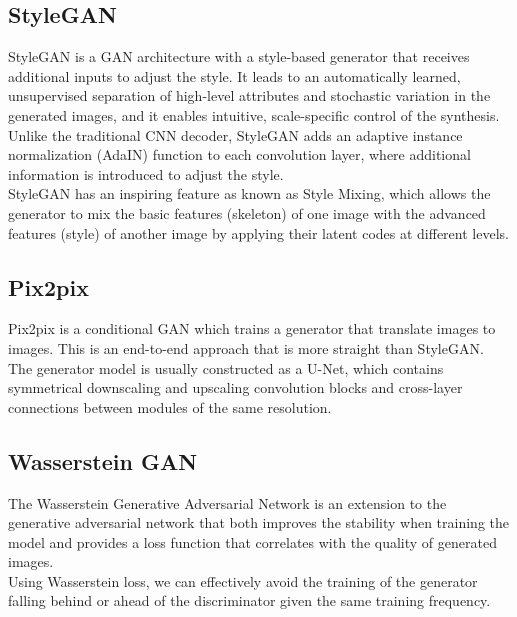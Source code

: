 \documentclass[letterpaper]{article}
\begin{document}
\subsection{StyleGAN}
StyleGAN is a GAN architecture with a style-based generator that receives additional inputs to adjust the style. It leads to an automatically learned, unsupervised separation of high-level attributes and stochastic variation in the generated images, and it enables intuitive, scale-specific control of the synthesis.
\\
Unlike the traditional CNN decoder, StyleGAN adds an adaptive instance normalization (AdaIN) function to each convolution layer, where additional information is introduced to adjust the style.
\\
StyleGAN has an inspiring feature as known as Style Mixing, which allows the generator to mix the basic features (skeleton) of one image with the advanced features (style) of another image by applying their latent codes at different levels.

\subsection{Pix2pix}
Pix2pix is a conditional GAN which trains a generator that translate images to images. This is an end-to-end approach that is more straight than StyleGAN.
\\
The generator model is usually constructed as a U-Net, which contains symmetrical downscaling and upscaling convolution blocks and cross-layer connections between modules of the same resolution.
\\

\subsection{Wasserstein GAN}
The Wasserstein Generative Adversarial Network is an extension to the generative adversarial network that both improves the stability when training the model and provides a loss function that correlates with the quality of generated images.
\\
Using Wasserstein loss, we can effectively avoid the training of the generator falling behind or ahead of the discriminator given the same training frequency.
\end{document}
